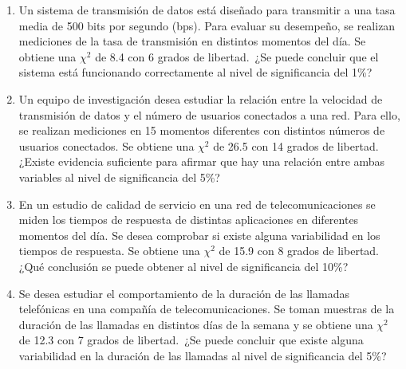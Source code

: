 \begin{Ejer}
\begin{enumerate}
\item Un sistema de transmisi\'on de datos est\'a dise\~nado para transmitir a una tasa media de 500 bits por segundo (bps). Para evaluar su desempe\~no, se realizan mediciones de la tasa de transmisi\'on en distintos momentos del d\'ia. Se obtiene una $\chi^2$ de 8.4 con 6 grados de libertad. \,¿Se puede concluir que el sistema est\'a funcionando correctamente al nivel de significancia del 1\%?

\item Un equipo de investigaci\'on desea estudiar la relaci\'on entre la velocidad de transmisi\'on de datos y el n\'umero de usuarios conectados a una red. Para ello, se realizan mediciones en 15 momentos diferentes con distintos n\'umeros de usuarios conectados. Se obtiene una $\chi^2$ de 26.5 con 14 grados de libertad. \,¿Existe evidencia suficiente para afirmar que hay una relaci\'on entre ambas variables al nivel de significancia del 5\%?

\item En un estudio de calidad de servicio en una red de telecomunicaciones se miden los tiempos de respuesta de distintas aplicaciones en diferentes momentos del d\'ia. Se desea comprobar si existe alguna variabilidad en los tiempos de respuesta. Se obtiene una $\chi^2$ de 15.9 con 8 grados de libertad. \,¿Qu\'e conclusi\'on se puede obtener al nivel de significancia del 10\%?

\item Se desea estudiar el comportamiento de la duraci\'on de las llamadas telef\'onicas en una compa\~n\'ia de telecomunicaciones. Se toman muestras de la duraci\'on de las llamadas en distintos d\'ias de la semana y se obtiene una $\chi^2$ de 12.3 con 7 grados de libertad. \,¿Se puede concluir que existe alguna variabilidad en la duraci\'on de las llamadas al nivel de significancia del 5\%?

\end{enumerate}
\end{Ejer} 



